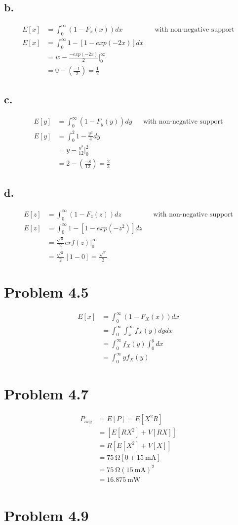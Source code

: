 \documentclass[12pt]{article}
\begin{document}
\subsection*{b.}
\begin{align*}
  E[x] &= \int_0^\infty (1-F_x(x))dx & & \textrm{with non-negative support} \\
  E[x] &= \int_0^\infty 1-[1-exp(-2x)]dx \\
  &= w - \frac{-exp(-2x)}{2}\big|_0^\infty \\
  &= 0 - (\frac{-1}{2}) = \frac{1}{2}
\end{align*}

\subsection*{c.}
\begin{align*}
  E[y] &= \int_0^\infty (1-F_y(y))dy & & \textrm{with non-negative support} \\
  E[y] &= \int_0^2 1-\frac{y^2}{4} dy \\
  &= y - \frac{y^3}{12}\big|_0^2 \\
  &= 2 - (\frac{-8}{12}) = \frac{2}{3}
\end{align*}

\subsection*{d.}
\begin{align*}
  E[z] &= \int_0^\infty (1-F_z(z))dz & & \textrm{with non-negative support} \\
  E[z] &= \int_0^\infty 1-[1-exp(-z^2)]dz \\
  &= \frac{\sqrt{\pi}}{2}erf(z)\big|_0^\infty \\
  &= \frac{\sqrt{\pi}}{2}[1-0] = \frac{\sqrt{\pi}}{2}
\end{align*}

\section*{Problem 4.5}
\begin{align*}
  E[x] &= \int_0^\infty (1-F_X(x))dx \\
  &= \int_0^\infty \int_x^\infty f_X(y)dydx \\
  &= \int_0^\infty f_X(y) \int_0^y dx \\
  &= \int_0^\infty yf_X(y)
\end{align*}  
\section*{Problem 4.7}
\begin{align*}
  P_{avg} &= E[P] = E[X^2R] \\
&= \left[E[RX^2] + V[RX]\right] \\
&= R\left[E[X^2] + V[X]\right] \\
&= \SI{75}{\ohm}\left[0 + \SI{15}{\milli\ampere}\right] \\
&= \SI{75}{\ohm}(\SI{15}{\milli\ampere})^2 \\
&= \SI{16.875}{\milli\watt} \\
\end{align*}
\section*{Problem 4.9}
\end{document}
